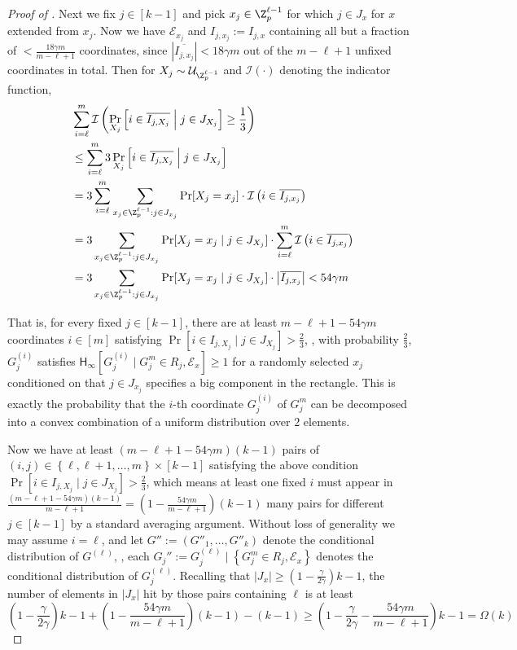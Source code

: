 \documentclass{toc}
\newcommand{\set}[1]{{\left \{{#1} \right \}}}
\newcommand{\cond}{\;|\;}
\newcommand{\Cond}{\;\Big|\;}
\newcommand{\follows}{\ensuremath{\sim}}
\newcommand{\bigomega}[1]{\ensuremath{{\Omega \left( {#1} \right)}}}
\newcommand{\eqdef}{\ensuremath{:=}}
\newcommand{\Hmin}{\ensuremath{\mathsf{H}_{\infty}}}
\newcommand{\event}{\ensuremath{\mathcal{E}}}
\begin{document}
\begin{proof}[Proof of ]
		Next we fix $j\in [k-1]$ and pick $x_j\in\Z_p^{\ell-1}$ for which $j\in J_{x}$ for $x$ extended from $x_j$.
		Now we have $\event_{x_j}$ and $I_{j,x_j} \eqdef I_{j,x}$ containing all but a fraction of $<\frac{18\gamma m}{m-\ell+1}$ coordinates, since $\left|\overline{I_{j,x_j}}\right|< 18\gamma m$ out of the $m-\ell+1$ unfixed coordinates in total.
		Then for $X_j\follows \mathcal{U}_{\Z_p^{\ell-1}}$ and $\mathcal{I}(\cdot)$ denoting the indicator function, 
		\begin{align*}
			& \sum_{i=\ell}^m \mathcal{I}\left( \Pr_{X_j}\left[ i\in \overline{I_{j,X_j}} \Cond j\in J_{X_j} \right] \ge \frac{1}{3}\right)\\
			&\le \sum_{i=\ell}^m 3 \Pr_{X_j} \left[ i\in \overline{I_{j,X_j}} \Cond j\in J_{X_j} \right] \\
			&= 3\sum_{i=\ell}^m \sum_{x_j\in \Z_p^{\ell-1}: j\in J_{x_j}} \Pr[X_j={x_j}] \cdot \mathcal{I}\left(  i\in \overline{I_{j,x_j}} \right)\\
			&= 3 \sum_{x_j\in \Z_p^{\ell-1}: j\in J_{x_j}} \Pr[X_j={x_j}\cond j\in J_{X_j}] \cdot \sum_{i=\ell}^m  \mathcal{I}\left(  i\in \overline{I_{j,x_j}} \right)\\
			&=  3 \sum_{x_j\in \Z_p^{\ell-1}: j\in J_{x_j}} \Pr[X_j={x_j}\cond j\in J_{X_j}] \cdot \left| \overline{I_{j,x_j}} \right|
			< 54 \gamma m
		\end{align*}

		That is, for every fixed  $j\in [k-1]$, there are at least $m-\ell+1-54\gamma m$ coordinates $i\in [m]$ satisfying $\Pr \left[ i\in I_{j,X_j} \Cond j\in J_{X_j} \right] > \frac{2}{3}$,
		\ie, with probability $\frac{2}{3}$, $G_j^{(i)}$ satisfies $\Hmin\left[ G_j^{(i)}\cond G_j^m\in R_j,\event_x  \right]\ge 1$ for a randomly selected $x_j$ conditioned on that $j\in J_{x_j}$ specifies a big component in the rectangle.
		This is exactly the probability that the $i$-th coordinate $G_j^{(i)} $ of $G_j^m$ can be decomposed into a convex combination of a uniform distribution over $2$ elements.

		Now we have at least $(m-\ell+1-54\gamma m)(k-1)$ pairs of $(i,j)\in \set{\ell,\ell+1,\dots,m}\times[k-1]$ satisfying the above condition $\Pr \left[ i\in I_{j,X_j} \Cond j\in J_{X_j} \right] > \frac{2}{3}$, 
		which means at least one fixed $i$ must appear in 
		$\frac {(m-\ell+1-54\gamma m)(k-1)}{m-\ell+1} = \left(1- \frac {54\gamma m}{m-\ell+1}\right)(k-1)$ many pairs for different $j\in[k-1]$ by a standard averaging argument.
		Without loss of generality we may assume $i=\ell$, and let $G''\eqdef(G''_1,\dots,G''_k)$ denote the conditional distribution of $G^{(\ell)}$, \ie, each $G_j''\eqdef G_j^{(\ell)}\Cond\set{G_j^m\in R_j,\event_x}$ denotes the conditional distribution of $G_j^{(\ell)}$. 
		Recalling that $|J_x|\ge \left(1-\frac{\gamma}{2\gamma}\right)k-1$, 
		the number of elements in $|J_x|$ hit by those pairs containing $\ell$ is at least
		$$\left(1-\frac{\gamma}{2\gamma}\right)k-1 +  \left(1- \frac {54\gamma m}{m-\ell+1}\right)(k-1) - (k-1) \ge  \left(1-\frac{\gamma}{2\gamma}- \frac {54\gamma m}{m-\ell+1}\right)k-1=\bigomega{k}$$ 


\end{proof}
\end{document}
